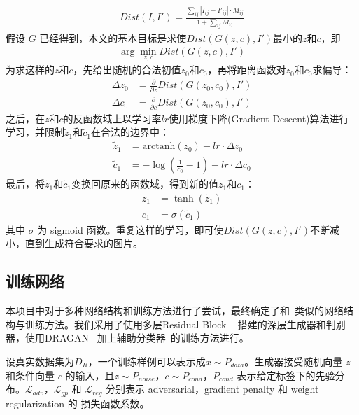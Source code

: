 \documentclass[a4paper,12pt,UTF8]{ctexart}
\begin{document}
\begin{align}
  Dist(I, I') = \frac{\sum_{ij} |I_{ij} - I'_{ij}| \cdot M_{ij}}{1 + \sum_{ij} M_{ij}}
\end{align}
%
假设 $G$ 已经得到，本文的基本目标是求使$Dist(G(z, c), I')$最小的$z$和$c$，即
%
\begin{align}
  \arg\min_{z, c} Dist(G(z, c), I')
\end{align}
%
为求这样的$z$和$c$，先给出随机的合法初值$z_{0}$和$c_{0}$，再将距离函数对$z_{0}$和$c_{0}$求偏导：
%
\begin{align}
  \Delta z_{0} & = \frac{\partial}{\partial z} Dist(G(z_{0}, c_{0}), I') \\
  \Delta c_{0} & = \frac{\partial}{\partial c} Dist(G(z_{0}, c_{0}), I')
\end{align}
%
之后，在$z$和$c$的反函数域上以学习率$lr$使用梯度下降(Gradient Descent)算法进行学习，并限制$\tilde z_{1}$和$\tilde c_{1}$在合法的边界中：
%
\begin{align}
  \tilde z_{1} & = \mathrm{arctanh}(z_{0}) - lr \cdot \Delta z_{0} \\
  \tilde c_{1} & = - \log \left(\frac{1}{c_{0}} - 1\right) - lr \cdot \Delta c_{0}
\end{align}
%
最后，将$\tilde z_{1}$和$\tilde c_{1}$变换回原来的函数域，得到新的值$z_{1}$和$c_{1}$：
%
\begin{align}
  z_{1} & = \tanh (\tilde z_{1}) \\
  c_{1} & = \sigma(\tilde c_{1})
\end{align}
%
其中 $\sigma$ 为 sigmoid 函数。重复这样的学习，即可使$Dist(G(z, c), I')$不断减小，直到生成符合要求的图片。


\subsection{训练网络}

本项目中对于多种网络结构和训练方法进行了尝试，最终确定了和~\cite{Jin2017Towards}类似的网络结构与训练方法。我们采用了使用多层Residual Block ~\cite{he2016deep} 搭建的深层生成器和判别器，使用DRAGAN ~\cite{kodali2017convergence}加上辅助分类器~\cite{odena2016conditional}的训练方法进行。

设真实数据集为$D_R$，一个训练样例可以表示成$x \sim P_{data}$。生成器接受随机向量 $z$ 和条件向量 $c$ 的输入，且$z \sim P_{noise}$，$c \sim P_{cond}$，$P_{cond}$ 表示给定标签下的先验分布。$\mathcal{L}_{adv}$，$\mathcal{L}_{gp}$ 和 $\mathcal{L}_{reg}$ 分别表示 adversarial，gradient penalty 和 weight regularization 的 损失函数系数。
\end{document}
